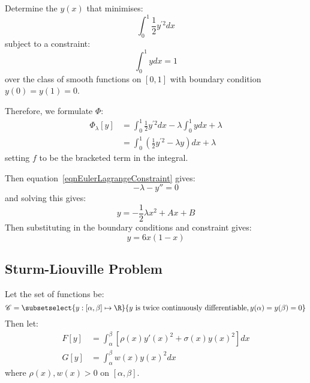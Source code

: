 \documentclass[../Main.tex]{subfiles}
\begin{document}
\begin{example}
    Determine the $y(x)$ that minimises:
    \begin{equation*}
        \int_0^1 \frac{1}{2} y^{\prime 2} dx 
    \end{equation*}
    subject to a constraint:
    \begin{equation*}
        \int_0^1 y dx = 1
    \end{equation*}
    over the class of smooth functions on $[0, 1]$ with boundary condition $y(0) = y(1) = 0$.

    Therefore, we formulate $\Phi$:
    \begin{align*}
        \Phi_\lambda[y] &= \int_0^1 \frac{1}{2} y^{\prime 2} dx - \lambda \int_0^1 y dx + \lambda \\
        &= \int_0^1 \left(\frac{1}{2} y^{\prime 2} - \lambda y\right)dx + \lambda
    \end{align*}
    setting $f$ to be the bracketed term in the integral.

    Then equation~\ref{eqnEulerLagrangeConstraint} gives:
    \begin{equation*}
        -\lambda - y'' = 0
    \end{equation*}
    and solving this gives:
    \begin{equation*}
        y = -\frac{1}{2} \lambda x^2 + Ax + B
    \end{equation*}
    Then substituting in the boundary conditions and constraint gives:
    \begin{equation*}
        y = 6x(1 - x)
    \end{equation*}
\end{example}
\subsection{Sturm-Liouville Problem}
Let the set of functions be:
\begin{equation*}
    \funcset = \subsetselect{y : [\alpha, \beta] \mapsto \R}{y \text{ is twice continuously differentiable}, y(\alpha) = y(\beta) = 0}
\end{equation*}
Then let:
\begin{align*}
    F[y] &= \int_\alpha^\beta [\rho(x) y'(x)^2 + \sigma(x) y(x)^2] dx \\
    G[y] &= \int_\alpha^\beta w(x) y(x)^2 dx
\end{align*}
where $\rho(x), w(x) > 0$ on $[\alpha, \beta]$.
\end{document}
